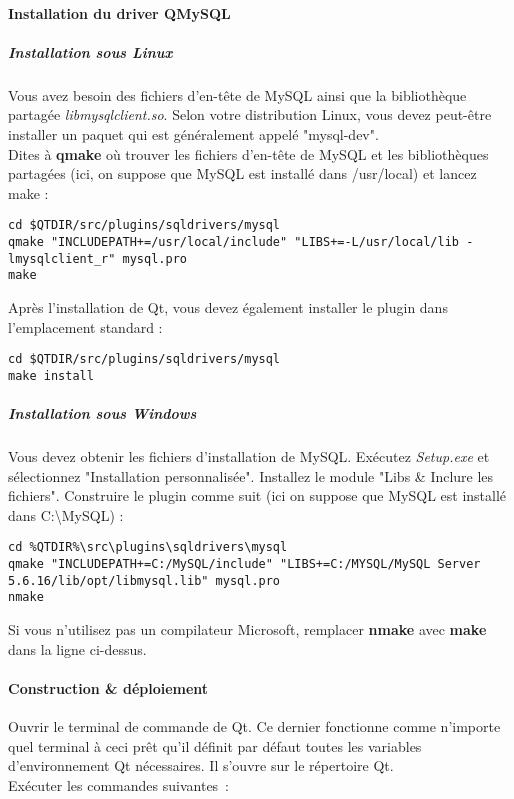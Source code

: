 \paragraph{Installation du driver QMySQL}

\subparagraph{Installation sous Linux }
Vous avez besoin des fichiers d'en-tête de MySQL ainsi que la bibliothèque partagée \textit{libmysqlclient.so}. Selon votre distribution Linux, vous devez peut-être installer un paquet qui est généralement appelé "mysql-dev". 
\\ Dites à \textbf{qmake} où trouver les fichiers d'en-tête de MySQL et les bibliothèques partagées (ici, on suppose que MySQL est installé dans /usr/local) et lancez make : \\
\begin{lstlisting}
cd $QTDIR/src/plugins/sqldrivers/mysql
qmake "INCLUDEPATH+=/usr/local/include" "LIBS+=-L/usr/local/lib -lmysqlclient_r" mysql.pro
make
\end{lstlisting}

Après l'installation de Qt, vous devez également installer le plugin dans l'emplacement standard :
\begin{lstlisting}
cd $QTDIR/src/plugins/sqldrivers/mysql
make install
\end{lstlisting}

\subparagraph{Installation sous Windows}
Vous devez obtenir les fichiers d'installation de MySQL. Exécutez \textit{Setup.exe} et sélectionnez "Installation personnalisée". Installez le module "Libs \& Inclure les fichiers". Construire le plugin comme suit (ici on suppose que MySQL est installé dans C:\textbackslash MySQL) : \\
\begin{lstlisting}
cd %QTDIR%\src\plugins\sqldrivers\mysql
qmake "INCLUDEPATH+=C:/MySQL/include" "LIBS+=C:/MYSQL/MySQL Server 5.6.16/lib/opt/libmysql.lib" mysql.pro
nmake
\end{lstlisting}

Si vous n'utilisez pas un compilateur Microsoft, remplacer \textbf{nmake} avec \textbf{make} dans la ligne ci-dessus.
\\


\paragraph{Construction \& déploiement}
Ouvrir le terminal de commande de Qt.
Ce dernier fonctionne comme n'importe quel terminal à ceci prêt qu'il définit par défaut toutes les variables d'environnement Qt nécessaires.
Il s'ouvre sur le répertoire Qt.
\\
Exécuter les commandes suivantes~:

